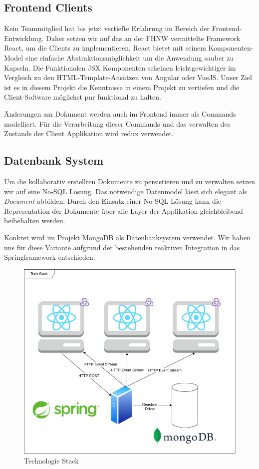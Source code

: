 \subsection{Frontend Clients}
Kein Teammitglied hat bis jetzt vertiefte Erfahrung im Bereich der Frontend-Entwicklung.
Daher setzen wir auf das an der FHNW vermittelte Framework React, um die Clients zu implementieren.
React bietet mit seinem Komponenten-Model eine einfache Abstraktionsmöglichkeit um die Anwendung sauber zu Kapseln.
Die Funktionalen JSX Komponenten scheinen leichtgewichtiger im Vergleich zu den HTML-Template-Ansätzen von Angular oder VueJS\@.
Unser Ziel ist es in diesem Projekt die Kenntnisse in einem Projekt zu vertiefen und die Client-Software möglichst pur funktional zu halten.

Änderungen am Dokument werden auch im Frontend immer als Commands modelliert.
Für die Verarbeitung dieser Commands und das verwalten des Zustands der Client Applikation wird redux verwendet.

\subsection{Datenbank System}
Um die kollaborativ erstellten Dokumente zu persistieren und zu verwalten setzen wir auf eine No-SQL Lösung.
Das notwendige Datenmodel lässt sich elegant als \emph{Document} abbilden.
Durch den Einsatz einer No-SQL Lösung kann die Representation der Dokumente über alle Layer der Applikation gleichbleibend beibehalten werden\@.

Konkret wird im Projekt MongoDB als Datenbanksystem verwendet.
Wir haben uns für diese Variante aufgrund der bestehenden reaktiven Integration in das Springframework entschieden.


\begin{figure}
    \includegraphics[width=\textwidth,height=\textheight,keepaspectratio]{images/TechStack2.drawio}
    \caption{Technologie Stack}
\end{figure}
